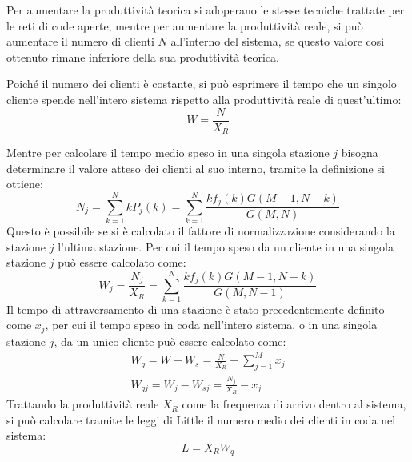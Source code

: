 \documentclass{article}
\numberwithin{equation}{subsection}
\begin{document}
Per aumentare la produttività teorica si adoperano le stesse tecniche trattate per le reti di code aperte, mentre per aumentare la produttività reale, si può aumentare 
il numero di clienti $N$ all'interno del sistema, se questo valore così ottenuto rimane inferiore della sua produttività teorica. 


Poiché il numero dei clienti è costante, si può esprimere il tempo che un singolo cliente spende nell'intero sistema rispetto alla produttività reale di quest'ultimo:
\begin{equation}
    W=\displaystyle\frac{N}{X_R}
\end{equation}

Mentre per calcolare il tempo medio speso in una singola stazione $j$ bisogna determinare il valore atteso dei clienti al suo interno, tramite la definizione si ottiene:
\begin{equation}
    N_j=\displaystyle\sum_{k=1}^NkP_j(k)=\sum_{k=1}^N\frac{kf_j(k)G(M-1,N-k)}{G(M,N)}
\end{equation}
Questo è possibile se si è calcolato il fattore di normalizzazione considerando la stazione $j$ l'ultima stazione. 
Per cui il tempo speso da un cliente in una singola stazione $j$ può essere calcolato come:
\begin{equation}
    W_j=\displaystyle\frac{N_j}{X_R}=\sum_{k=1}^N\frac{kf_j(k)G(M-1,N-k)}{G(M,N-1)}
\end{equation}
Il tempo di attraversamento di una stazione è stato precedentemente definito come $x_j$, per cui il tempo speso in coda nell'intero sistema, o in una singola stazione $j$, 
da un unico cliente può essere calcolato come:
\begin{gather}
    W_q=W-W_s=\displaystyle\frac{N}{X_R}-\sum_{j=1}^Mx_j\\
    W_{qj}=W_j-W_{sj}=\displaystyle\frac{N_j}{X_R}-x_j
\end{gather}
Trattando la produttività reale $X_R$ come la frequenza di arrivo dentro al sistema, si può calcolare tramite le leggi di Little il numero medio dei clienti in coda nel sistema:
\begin{equation}
    L=X_RW_q
\end{equation}
\end{document}
